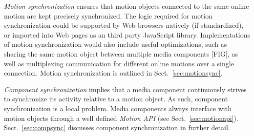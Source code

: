 \emph{Motion synchronization} ensures that motion objects connected to the same
online motion are kept precisely synchronized. The logic required for motion
synchronization could be supported by Web browsers natively (if standardized),
or imported into Web pages as an third party JavaScript library.
Implementations of motion synchronization would also include useful
optimizations, such as sharing the same motion object between multiple media
components [FIG], as well as multiplexing communication for different
online motions over a single connection. Motion synchronization is outlined in
Sect.~\ref{sec:motionsync}.

\emph{Component synchronization} implies that a media component continuously strives
to synchronize its activity relative to a motion object. As such, component
synchronization is a local problem. Media components always interface with
motion objects through a well defined \emph{Motion API} (see Sect.~\ref{sec:motionapi}).
Sect.~\ref{sec:compsync} discusses component synchronization in
further detail.
